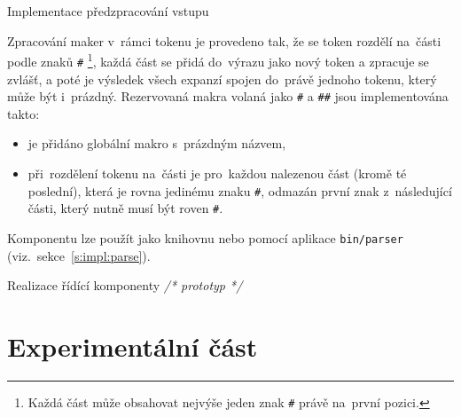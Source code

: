 \documentclass[thesis=M,czech]{FITthesis}[2012/06/26]
\newcommand{\cmt}[1]{\textit{/* #1 */}}
\newcommand{\id}[1]{\texttt{#1}}
\newcommand{\rf}[1]{\ref{#1}}
\begin{document}
\begin{section}{Implementace předzpracování vstupu}
\begin{paragraph}{Zpracování maker v~rámci tokenu}
\label{s:impl:preprocess:in_token}
je provedeno tak, že se token rozdělí na~části
podle znaků \id{\#}%
\footnote{Každá část může obsahovat nejvýše jeden znak \id{\#}
právě na~první pozici.}, každá část se přidá do~výrazu
jako nový token a zpracuje se zvlášť,
a poté je výsledek všech expanzí spojen do~právě jednoho tokenu,
který může být i~prázdný.
Rezervovaná makra volaná jako \id{\#} a \id{\#\#}
jsou implementována takto:
\begin{itemize}
\item je přidáno globální makro s~prázdným názvem,
\item při~rozdělení tokenu na~části
   je pro~každou nalezenou část (kromě té poslední),
   která je rovna jedinému znaku \id{\#},
   odmazán první znak z~následující části,
   který nutně musí být roven \id{\#}.
\end{itemize}
\end{paragraph} %


\bigskip

Komponentu lze použít jako knihovnu
nebo pomocí aplikace \id{bin/parser}
(viz.~sekce~\rf{s:impl:parse}).
\end{section} %



\begin{section}{Realizace řídící komponenty}\label{s:impl:center}
\cmt{prototyp}
\end{section} %



\chapter{Experimentální část}\label{ch:exp}


\begin{conclusion}\label{ch:outro}
\end{conclusion}

\end{document}
